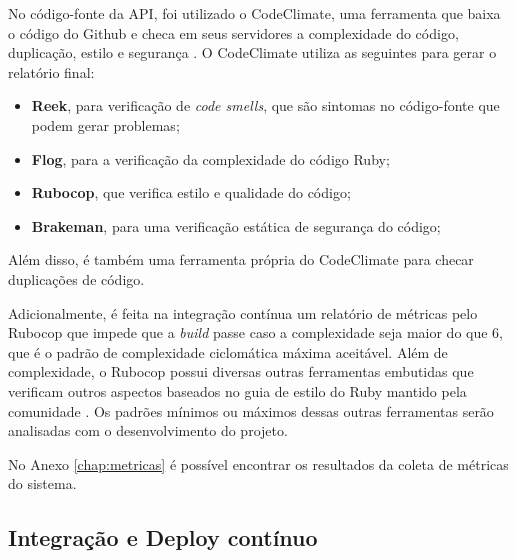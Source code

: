 No código-fonte da API, foi utilizado o CodeClimate, uma ferramenta que baixa o código do Github e checa em seus servidores a complexidade do código, duplicação, estilo e segurança \cite{codeclimate}. O CodeClimate utiliza as seguintes para gerar o relatório final:
\begin{itemize}
    \item \textbf{Reek}, para verificação de \textit{code smells}, que são sintomas no código-fonte que podem gerar problemas;
    \item \textbf{Flog}, para a verificação da complexidade do código Ruby;
    \item \textbf{Rubocop}, que verifica estilo e qualidade do código;
    \item \textbf{Brakeman}, para uma verificação estática de segurança do código;
\end{itemize}

Além disso, é também uma ferramenta própria do CodeClimate para checar duplicações de código.

Adicionalmente, é feita na integração contínua um relatório de métricas pelo Rubocop que impede que a \textit{build} passe caso a complexidade seja maior do que 6, que é o padrão de complexidade ciclomática máxima aceitável. Além de complexidade, o Rubocop possui diversas outras ferramentas embutidas que verificam outros aspectos baseados no guia de estilo do Ruby mantido pela comunidade \cite{rubocop}. Os padrões mínimos ou máximos dessas outras ferramentas serão analisadas com o desenvolvimento do projeto.

No Anexo \ref{chap:metricas} é possível encontrar os resultados da coleta de métricas do sistema.

\subsection{Integração e Deploy contínuo}

